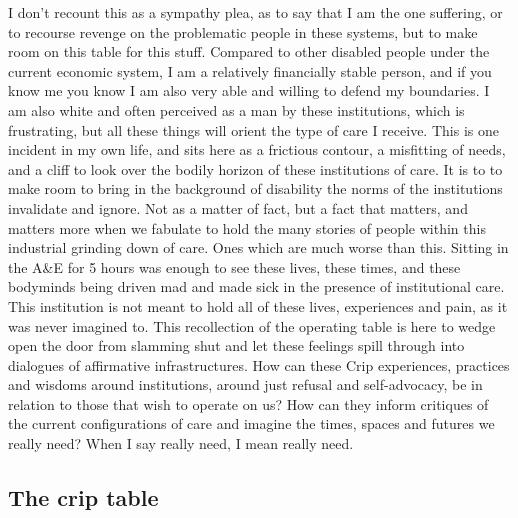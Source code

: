 I don't recount this as a sympathy plea, as to say that I am the one
suffering, or to recourse revenge on the problematic people in these
systems, but to make room on this table for this stuff. Compared to
other disabled people under the current economic system, I am a
relatively financially stable person, and if you know me you know I am
also very able and willing to defend my boundaries. I am also white and
often perceived as a man by these institutions, which is frustrating,
but all these things will orient the type of care I receive. This is one
incident in my own life, and sits here as a frictious contour, a
misfitting of needs, and a cliff to look over the bodily horizon of
these institutions of care. It is to to make room to bring in the
background of disability the norms of the institutions invalidate and
ignore. Not as a matter of fact, but a fact that matters, and matters
more when we fabulate to hold the many stories of people within this
industrial grinding down of care. Ones which are much worse than this.
Sitting in the A\&E for 5 hours was enough to see these lives, these
times, and these bodyminds being driven mad and made sick in the
presence of institutional care. This institution is not meant to hold
all of these lives, experiences and pain, as it was never imagined to.
This recollection of the operating table is here to wedge open the door
from slamming shut and let these feelings spill through into dialogues
of affirmative infrastructures. How can these Crip experiences,
practices and wisdoms around institutions, around just refusal and
self-advocacy, be in relation to those that wish to operate on us? How
can they inform critiques of the current configurations of care and
imagine the times, spaces and futures we really need? When I say really
need, I mean really need.

\hypertarget{the-crip-table}{%
\subsection[The crip
table]{\texorpdfstring{\protect\hypertarget{anchor}{}{}The crip
table}{The crip table}}\label{the-crip-table}}

